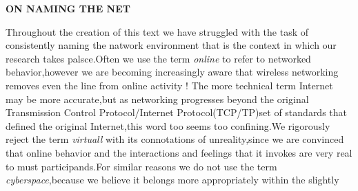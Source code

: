 \documentclass[10pt,a4paper]{book}
\begin{document}
\begin{flushleft}
  \textbf{\!\!\!\!\!\!\!\!\!\!\!\!ON NAMING THE NET}
\end{flushleft}

\!\!\!\!\!\!\!\!\!\!Throughout the creation of this text we have struggled with the task of consistently naming the natwork environment that is the context in which our research takes palsce.Often we use the term \textit{online} to refer to networked behavior,however we are becoming increasingly aware that wireless networking removes even the line from online activity $!$ The more technical term Internet may be more accurate,but as networking progresses beyond the original Transmission Control Protocol/Internet Protocol(TCP/TP)set of standards that defined the original Internet,this word too seems too confining.We rigorously reject the term \emph{virtuall} with its connotations of unreality,since we are convinced that online behavior and the interactions and feelings that it invokes are very real to must participands.For similar reasons we do not use the term \emph{cyberspace},because we believe it belongs more appropriately within the slightly
\end{document}
